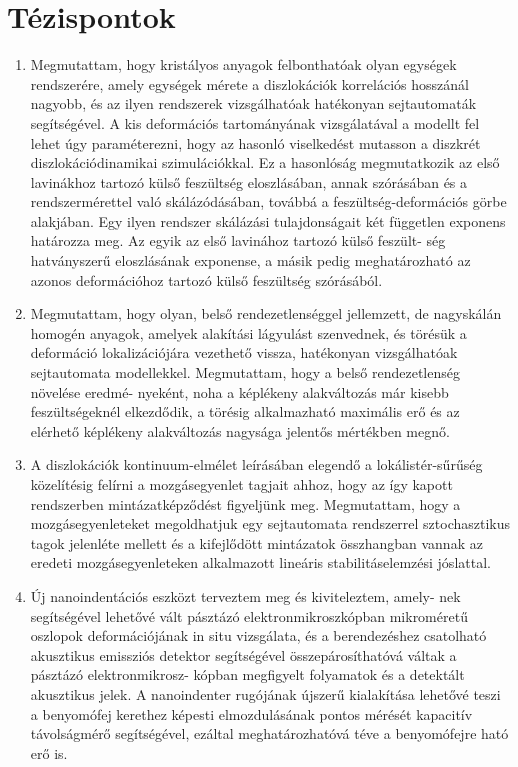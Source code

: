 \documentclass[a5paper,twoside,10pt]{article}
\begin{document}
\section*{Tézispontok}
\begin{enumerate}
\item Megmutattam, hogy kristályos anyagok felbonthatóak olyan egységek rendszerére, amely egységek mérete a diszlokációk korrelációs hosszánál nagyobb, és az ilyen rendszerek vizsgálhatóak hatékonyan sejtautomaták segítségével. A kis deformációs tartományának vizsgálatával a modellt fel lehet úgy paraméterezni, hogy az hasonló viselkedést mutasson a diszkrét diszlokációdinamikai szimulációkkal. Ez a hasonlóság megmutatkozik az első lavinákhoz tartozó külső feszültség eloszlásában, annak szórásában és a rendszermérettel való skálázódásában, továbbá a feszültség-deformációs görbe alakjában. Egy ilyen rendszer skálázási tulajdonságait két független exponens határozza meg. Az egyik az első lavinához tartozó külső feszült- ség hatványszerű eloszlásának exponense, a másik pedig meghatározható az azonos deformációhoz tartozó külső feszültség szórásából. \cite{PhysRevB.95.054108}

\item Megmutattam, hogy olyan, belső rendezetlenséggel jellemzett, de nagyskálán homogén anyagok, amelyek alakítási lágyulást szenvednek, és törésük a deformáció lokalizációjára vezethető vissza, hatékonyan vizsgálhatóak sejtautomata modellekkel. Megmutattam, hogy a belső rendezetlenség növelése eredmé- nyeként, noha a képlékeny alakváltozás már kisebb feszültségeknél elkezdődik, a törésig alkalmazható maximális erő és az elérhető képlékeny alakváltozás nagysága jelentős mértékben megnő. \cite{Tuzes2017}

\item A diszlokációk kontinuum-elmélet leírásában elegendő a lokálistér-sűrűség közelítésig felírni a mozgásegyenlet tagjait ahhoz, hogy az így kapott rendszerben mintázatképződést figyeljünk meg. Megmutattam, hogy a mozgásegyenleteket megoldhatjuk egy sejtautomata rendszerrel sztochasztikus tagok jelenléte mellett és a kifejlődött mintázatok összhangban vannak az eredeti mozgásegyenleteken alkalmazott lineáris stabilitáselemzési jóslattal. \cite{PhysRevB.98.054110}

\item Új nanoindentációs eszközt terveztem meg és kiviteleztem, amely- nek segítségével lehetővé vált pásztázó elektronmikroszkópban mikroméretű oszlopok deformációjának in situ vizsgálata, és a berendezéshez csatolható akusztikus emissziós detektor segítségével összepárosíthatóvá váltak a pásztázó elektronmikrosz- kópban megfigyelt folyamatok és a detektált akusztikus jelek. A nanoindenter rugójának újszerű kialakítása lehetővé teszi a benyomófej kerethez képesti elmozdulásának pontos mérését kapacitív távolságmérő segítségével, ezáltal meghatározhatóvá téve a benyomófejre ható erő is. \cite{hegyi}
\end{enumerate}
\end{document}
